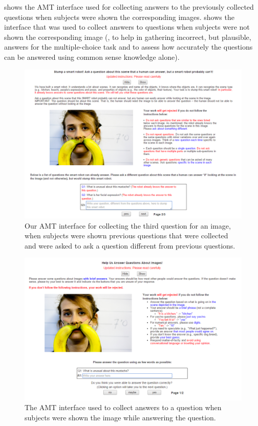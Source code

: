  shows the AMT interface used for collecting answers to the previously collected questions when subjects were shown the corresponding images.  shows the interface that was used to collect answers to questions when subjects were not shown the corresponding image (\ie, to help in gathering incorrect, but plausible, answers for the multiple-choice task and to assess how accurately the questions can be answered using common sense knowledge alone).

\begin{figure}[h]
\centering
\includegraphics[width=1\linewidth]{figures/question_stage03.png}
\caption{Our AMT interface for collecting the third question for an image, when subjects were shown previous questions that were collected and were asked to ask a question different from previous questions.}
\label{fig:qstage03}
\end{figure}

\begin{figure}[h]
\centering
\includegraphics[width=1\linewidth]{figures/answer_with_image.png}
\caption{The AMT interface used to collect answers to a question when subjects were shown the image while answering the question.}
\label{fig:answimage}
\end{figure}

